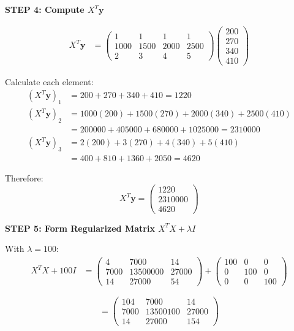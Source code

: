 \documentclass[12pt]{article}
\begin{document}
\begin{solution}
\textbf{STEP 4: Compute $X^T\mathbf{y}$}

\begin{align*}
X^T\mathbf{y} &= \begin{pmatrix}
1 & 1 & 1 & 1 \\
1000 & 1500 & 2000 & 2500 \\
2 & 3 & 4 & 5
\end{pmatrix}
\begin{pmatrix} 200 \\ 270 \\ 340 \\ 410 \end{pmatrix}
\end{align*}

Calculate each element:
\begin{align*}
(X^T\mathbf{y})_1 &= 200 + 270 + 340 + 410 = 1220 \\
(X^T\mathbf{y})_2 &= 1000(200) + 1500(270) + 2000(340) + 2500(410) \\
&= 200000 + 405000 + 680000 + 1025000 = 2310000 \\
(X^T\mathbf{y})_3 &= 2(200) + 3(270) + 4(340) + 5(410) \\
&= 400 + 810 + 1360 + 2050 = 4620
\end{align*}

Therefore:
\[
X^T\mathbf{y} = \begin{pmatrix} 1220 \\ 2310000 \\ 4620 \end{pmatrix}
\]

\textbf{STEP 5: Form Regularized Matrix $X^TX + \lambda I$}

With $\lambda = 100$:
\begin{align*}
X^TX + 100I &= \begin{pmatrix}
4 & 7000 & 14 \\
7000 & 13500000 & 27000 \\
14 & 27000 & 54
\end{pmatrix}
+ \begin{pmatrix}
100 & 0 & 0 \\
0 & 100 & 0 \\
0 & 0 & 100
\end{pmatrix}
\end{align*}

\[
= \begin{pmatrix}
104 & 7000 & 14 \\
7000 & 13500100 & 27000 \\
14 & 27000 & 154
\end{pmatrix}
\]


\end{solution}
\end{document}

